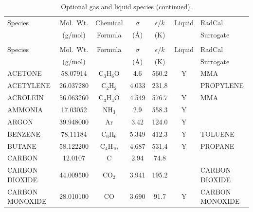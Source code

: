 \documentclass[11pt]{book}
\begin{document}
\begin{longtable}{@{\extracolsep{\fill}}|l|c|c|c|c|c|l|}
\caption[Pre-defined gas and liquid species]{Pre-defined gas and liquid species~\cite{Reid:1}}
\label{tab:gasspecies}\\
\hline
Species &   Mol.~Wt.            & Chemical         & $\sigma$ & $\epsilon/k$   & Liquid   & RadCal                     \\
        &   (g/mol)             & Formula          & (\AA)    & (K)            &          & Surrogate                  \\
\hline \hline
\endfirsthead
\caption[]{Optional gas and liquid species (continued).}\\
\hline
Species &   Mol.~Wt.            & Formula          & $\sigma$ & $\epsilon/k$   & Liquid   & RadCal                     \\
        &   (g/mol)             &                  & (\AA)    & (K)            &          & Surrogate                  \\
\hline \hline
\endhead
{\ct ACETONE}            & 58.07914   & C$_3$H$_6$O      & 4.6      & 560.2    &  Y       &  {\ct MMA}                 \\ \hline
{\ct ACETYLENE}          & 26.037280  & C$_2$H$_2$       & 4.033    & 231.8    &          &  {\ct PROPYLENE}           \\ \hline
{\ct ACROLEIN}           & 56.063260  & C$_3$H$_4$O      & 4.549    & 576.7    &  Y       &  {\ct MMA}                 \\ \hline
{\ct AMMONIA}            & 17.03052  & NH$_3$            & 2.9      & 558.3    &  Y       &                            \\ \hline
{\ct ARGON}              & 39.948000  & Ar               & 3.42     & 124.0    &  Y       &                            \\ \hline
{\ct BENZENE}            & 78.11184   & C$_6$H$_6$       & 5.349    & 412.3    &  Y       &  {\ct TOLUENE}             \\ \hline
{\ct BUTANE}             & 58.122200  & C$_4$H$_{10}$    & 4.687    & 531.4    &  Y       &  {\ct PROPANE}             \\ \hline
{\ct CARBON}             & 12.0107    & C                & 2.94     & 74.8     &          &                            \\ \hline
{\ct CARBON DIOXIDE}     & 44.009500  & CO$_2$           & 3.941    & 195.2    &          &  {\ct CARBON DIOXIDE}      \\ \hline
{\ct CARBON MONOXIDE}    & 28.010100  & CO               & 3.690    & 91.7     &  Y       &  {\ct CARBON MONOXIDE}     \\ \hline

\end{longtable}
\end{document}
